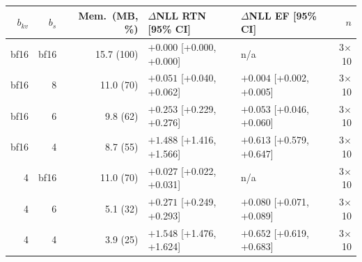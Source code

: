 \begin{tabular}{rrrllr}
\toprule
$b_{kv}$ & $b_s$ & Mem.\ (MB, \%) & $\Delta$NLL RTN [95\% CI] & $\Delta$NLL EF [95\% CI] & $n$ \\
\midrule
bf16 & bf16 & 15.7 (100) & $+0.000$ [+0.000, +0.000] & n/a & 3$\times$10 \\
bf16 & 8 & 11.0 (70) & $+0.051$ [+0.040, +0.062] & $+0.004$ [+0.002, +0.005] & 3$\times$10 \\
bf16 & 6 & 9.8 (62) & $+0.253$ [+0.229, +0.276] & $+0.053$ [+0.046, +0.060] & 3$\times$10 \\
bf16 & 4 & 8.7 (55) & $+1.488$ [+1.416, +1.566] & $+0.613$ [+0.579, +0.647] & 3$\times$10 \\
4 & bf16 & 11.0 (70) & $+0.027$ [+0.022, +0.031] & n/a & 3$\times$10 \\
4 & 6 & 5.1 (32) & $+0.271$ [+0.249, +0.293] & $+0.080$ [+0.071, +0.089] & 3$\times$10 \\
4 & 4 & 3.9 (25) & $+1.548$ [+1.476, +1.624] & $+0.652$ [+0.619, +0.683] & 3$\times$10 \\
\bottomrule
\end{tabular}
